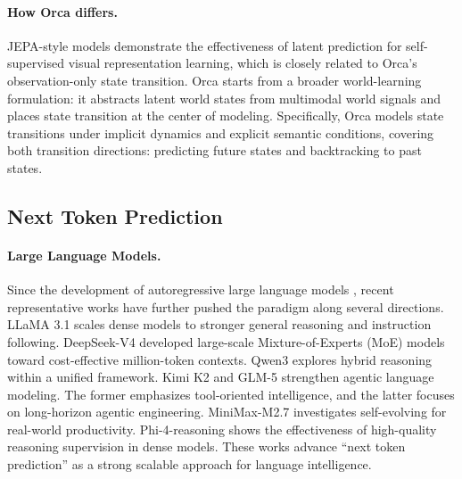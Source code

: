 \documentclass{llmxive}
\begin{document}
\vspace{-0.5em}
\paragraph{How Orca differs.}
JEPA-style models demonstrate the effectiveness of latent prediction for self-supervised visual representation learning, which is closely related to Orca's observation-only state transition.
Orca starts from a broader world-learning formulation: it abstracts latent world states from multimodal world signals and places state transition at the center of modeling.
Specifically, Orca models state transitions under implicit dynamics and explicit semantic conditions, covering both transition directions: predicting future states and backtracking to past states.

\vspace{-1em}
\subsection{Next Token Prediction}\label{sec:ntp}
\paragraph{Large Language Models.}\label{sec:llms}
Since the development of autoregressive large language models \citep{DeepSeek-R1, Llama-2}, recent representative works have further pushed the paradigm along several directions. 
LLaMA 3.1 \citep{llama3.1} scales dense models to stronger general reasoning and instruction following. DeepSeek-V4 \citep{DeepSeek-V4} developed large-scale Mixture-of-Experts (MoE) models toward cost-effective million-token contexts. Qwen3 \citep{Qwen3} explores hybrid reasoning within a unified framework. Kimi K2 \citep{Kimi-K2} and GLM-5 \citep{GLM-5} strengthen agentic language modeling. The former emphasizes tool-oriented intelligence, and the latter focuses on long-horizon agentic engineering. MiniMax-M2.7 \citep{MiniMax-M2.7} investigates self-evolving for real-world productivity. Phi-4-reasoning \citep{Phi-4-reasoning} shows the effectiveness of high-quality reasoning supervision in dense models. These works advance ``next token prediction'' as a strong scalable approach for language intelligence.


\vspace{-0.5em}
\end{document}
